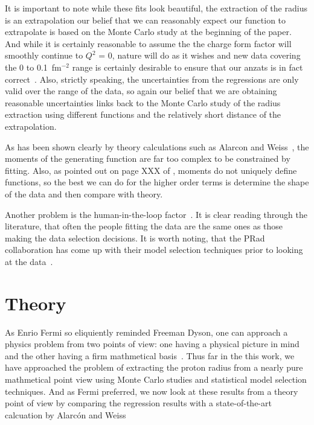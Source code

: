 \documentclass[10pt,aps,prc,twocolumn]{revtex4-1}
\begin{document}
It is important to note while these fits look beautiful, the extraction of the radius is an
extrapolation our belief that we can reasonably expect our function to extrapolate is based
on the Monte Carlo study at the beginning of the paper.    And while it is certainly reasonable
to assume the the charge form factor will smoothly continue to $Q^2$ = 0,
nature will do as it wishes and new data covering the 0 to 0.1~fm$^{-2}$ range is 
certainly desirable to ensure that our anzats is in fact correct~\cite{Gasparian:2014rna,
Peng:2016szv, Mihovilovic:2016rkr}.   
Also, strictly speaking, the
uncertainties from the regressions are only valid over the range of the data, so again our 
belief that we are obtaining reasonable uncertainties links back to the Monte Carlo study of the
radius extraction using different functions and the relatively short distance of the extrapolation.

As has been shown clearly by theory calculations
such as Alarcon and Weiss~\cite{}, the moments of the generating function are far too complex to be constrained
by fitting.  Also, as pointed out on page XXX of \cite{}, moments do not uniquely define functions, so the best
we can do for the higher order terms is determine the shape of the data and then compare with theory.

Another problem is the human-in-the-loop factor~\cite{Daee:2018:UMA:3172944.3172989}.   It is clear 
reading through the literature, that often the people fitting the data are the
same ones as those making the data selection decisions.
It is worth noting, that the PRad collaboration has come up with their model selection techniques
prior to looking at the data~\cite{Yan:2018bez}.

\section{Theory}

As Enrio Fermi so eliquiently reminded Freeman Dyson, one can approach a physics problem from two points
of view: one having a physical picture in mind and the other having a firm mathmetical basis~\cite{Dyson:2004}.  
Thus far in the this work, we have approached the problem of extracting the proton radius from a nearly pure 
mathmetical point view using Monte Carlo studies and statistical model selection techniques.  
And as Fermi preferred, we now look at these results from a theory point of view by comparing the 
regression results with a state-of-the-art calcuation by Alarc\'{o}n and 
Weiss~\cite{Alarcon:2017ivh,Alarcon:2017chi,Alarcon:2017lhg,Alarcon:2012kn}
\end{document}
